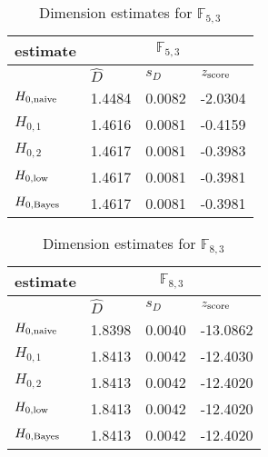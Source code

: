 \begin{table}[H] 
\begin{center}
\caption{Dimension estimates for $\mathbb{F}_{5,3}$}
\label{tab:est3}
\begin{tabular}{|l|l|l|l|}
\hline
 estimate & \multicolumn{3}{c|}{$\mathbb{F}_{5,3}$} \\
\hline
 & $\hat{D}$ & $s_{D}$ & $z_{\mbox{\scriptsize{score}}}$ \\
\hline 
$ H_{0,\mbox{\scriptsize{naive}}}  $ & 1.4484 & 0.0082 & -2.0304 \\ 
\hline 
$ H_{0,1} $ & 1.4616 & 0.0081 & -0.4159 \\ 
\hline 
$ H_{0,2} $ & 1.4617 & 0.0081 & -0.3983 \\ 
\hline 
$ H_{0,\mbox{\scriptsize{low}}} $ & 1.4617 & 0.0081 & -0.3981 \\ 
\hline 
$ H_{0,\mbox{\scriptsize{Bayes}}} $ & 1.4617 & 0.0081 & -0.3981 \\ 
\hline 
\end{tabular}
\end{center}
\end{table}

\begin{table}[H] 
\begin{center}
\caption{Dimension estimates for $\mathbb{F}_{8,3}$}
\label{tab:est4}
\begin{tabular}{|l|l|l|l|}
\hline
 estimate & \multicolumn{3}{c|}{$\mathbb{F}_{8,3}$} \\
\hline
 & $\hat{D}$ & $s_{D}$ & $z_{\mbox{\scriptsize{score}}}$ \\
\hline
$ H_{0,\mbox{\scriptsize{naive}}} $ & 1.8398 & 0.0040 & -13.0862 \\ 
\hline 
$ H_{0,1} $ & 1.8413 & 0.0042 & -12.4030 \\ 
\hline 
$ H_{0,2} $ & 1.8413 & 0.0042 & -12.4020 \\ 
\hline 
$ H_{0,\mbox{\scriptsize{low}}} $ & 1.8413 & 0.0042 & -12.4020 \\ 
\hline 
$ H_{0,\mbox{\scriptsize{Bayes}}} $ & 1.8413 & 0.0042 & -12.4020 \\ 
\hline 
\end{tabular}
\end{center}
\end{table}







